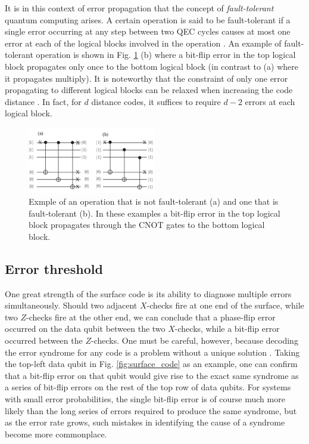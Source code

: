 It is in this context of error propagation that the concept of
\textit{fault-tolerant} quantum computing arises. A certain operation is said to
be fault-tolerant if a single error occurring at any step between two QEC cycles
causes at most one error at each of the logical blocks involved in the operation
\cite{Devitt_2013}. An example of fault-tolerant operation is shown in Fig.
\ref{fig:fault_tol} (b) where a bit-flip error in the top logical block
propagates only once to the bottom logical block (in contrast to (a) where it
propagates multiply). It is noteworthy that the constraint of only one
error propagating to different logical blocks can be relaxed when increasing the
code distance \cite{Devitt_2013}. In fact, for $d$ distance codes, it suffices
to require $d-2$ errors at each logical block.

\begin{figure}[htbp]
  \centering
  \includegraphics[width=0.5\textwidth]{images/fault_tolerance.pdf}
  \caption{Exmple of an operation that is not fault-tolerant (a) and one that is
    fault-tolerant (b). In these examples a bit-flip error in the top logical
    block propagates through the CNOT gates to the bottom logical block.}
  \label{fig:fault_tol}
\end{figure}

\subsection{Error threshold}
One great strength of the surface code is its ability to diagnose multiple
errors simultaneously. Should two adjacent $X$-checks fire at one end of the
surface, while two $Z$-checks fire at the other end, we can conclude that a
phase-flip error occurred on the data qubit between the two $X$-checks, while a
bit-flip error occurred between the $Z$-checks. One must be careful, however,
because decoding the error syndrome for any code is a problem without a unique
solution \cite{terhal15}. Taking the top-left data qubit in Fig.
\ref{fig:surface_code} as an example, one can confirm that a bit-flip error on
that qubit would give rise to the exact same syndrome as a series of bit-flip
errors on the rest of the top row of data qubits. For systems with small error
probabilities, the single bit-flip error is of course much more likely than the
long series of errors required to produce the same syndrome, but as the error
rate grows, such mistakes in identifying the cause of a syndrome become more
commonplace.

